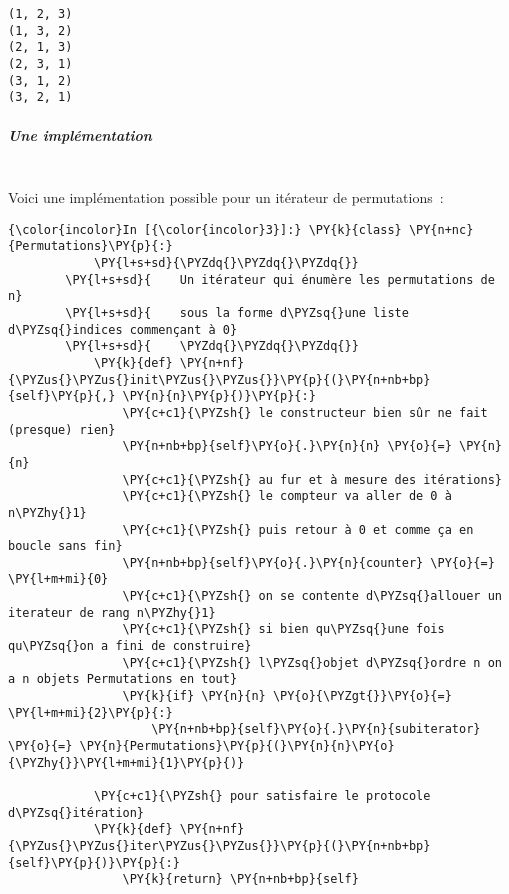     \begin{Verbatim}[commandchars=\\\{\}]
(1, 2, 3)
(1, 3, 2)
(2, 1, 3)
(2, 3, 1)
(3, 1, 2)
(3, 2, 1)

    \end{Verbatim}

    \hypertarget{une-impluxe9mentation}{%
\subparagraph{Une implémentation\\\\}\label{une-impluxe9mentation}}

    Voici une implémentation possible pour un itérateur de permutations~:

    \begin{Verbatim}[commandchars=\\\{\}]
{\color{incolor}In [{\color{incolor}3}]:} \PY{k}{class} \PY{n+nc}{Permutations}\PY{p}{:}
            \PY{l+s+sd}{\PYZdq{}\PYZdq{}\PYZdq{}}
        \PY{l+s+sd}{    Un itérateur qui énumère les permutations de n}
        \PY{l+s+sd}{    sous la forme d\PYZsq{}une liste d\PYZsq{}indices commençant à 0}
        \PY{l+s+sd}{    \PYZdq{}\PYZdq{}\PYZdq{}}
            \PY{k}{def} \PY{n+nf}{\PYZus{}\PYZus{}init\PYZus{}\PYZus{}}\PY{p}{(}\PY{n+nb+bp}{self}\PY{p}{,} \PY{n}{n}\PY{p}{)}\PY{p}{:}
                \PY{c+c1}{\PYZsh{} le constructeur bien sûr ne fait (presque) rien}
                \PY{n+nb+bp}{self}\PY{o}{.}\PY{n}{n} \PY{o}{=} \PY{n}{n}
                \PY{c+c1}{\PYZsh{} au fur et à mesure des itérations}
                \PY{c+c1}{\PYZsh{} le compteur va aller de 0 à n\PYZhy{}1}
                \PY{c+c1}{\PYZsh{} puis retour à 0 et comme ça en boucle sans fin}
                \PY{n+nb+bp}{self}\PY{o}{.}\PY{n}{counter} \PY{o}{=} \PY{l+m+mi}{0}
                \PY{c+c1}{\PYZsh{} on se contente d\PYZsq{}allouer un iterateur de rang n\PYZhy{}1}
                \PY{c+c1}{\PYZsh{} si bien qu\PYZsq{}une fois qu\PYZsq{}on a fini de construire}
                \PY{c+c1}{\PYZsh{} l\PYZsq{}objet d\PYZsq{}ordre n on a n objets Permutations en tout}
                \PY{k}{if} \PY{n}{n} \PY{o}{\PYZgt{}}\PY{o}{=} \PY{l+m+mi}{2}\PY{p}{:}
                    \PY{n+nb+bp}{self}\PY{o}{.}\PY{n}{subiterator} \PY{o}{=} \PY{n}{Permutations}\PY{p}{(}\PY{n}{n}\PY{o}{\PYZhy{}}\PY{l+m+mi}{1}\PY{p}{)}
        
            \PY{c+c1}{\PYZsh{} pour satisfaire le protocole d\PYZsq{}itération}
            \PY{k}{def} \PY{n+nf}{\PYZus{}\PYZus{}iter\PYZus{}\PYZus{}}\PY{p}{(}\PY{n+nb+bp}{self}\PY{p}{)}\PY{p}{:}
                \PY{k}{return} \PY{n+nb+bp}{self}
        

\end{Verbatim}
